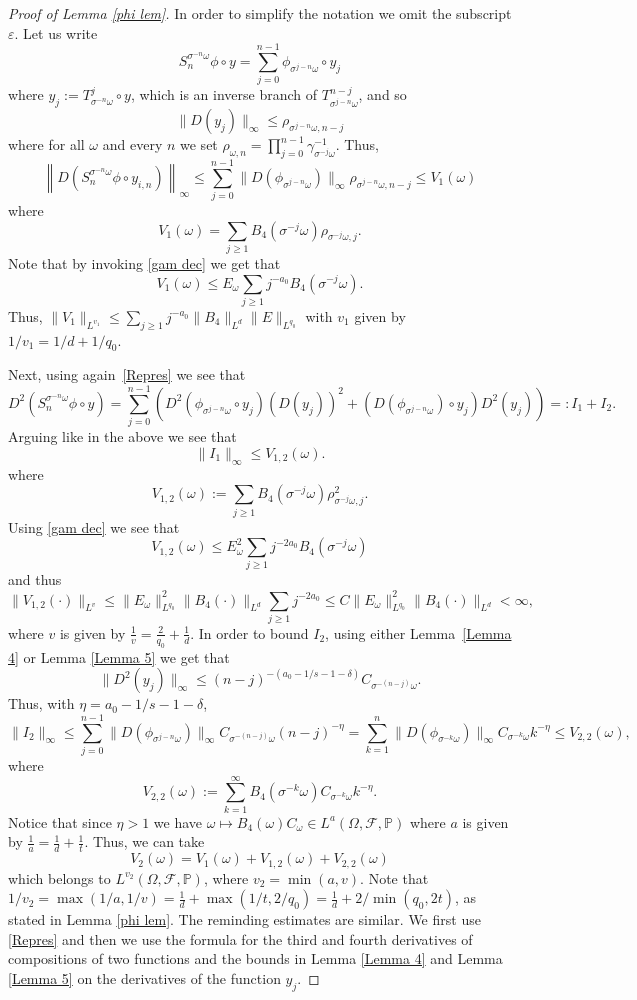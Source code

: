 \documentclass[11pt,reqno,a4paper]{article}
\theoremstyle{special}
\def\om{\omega}
\begin{document}
\begin{proof}[Proof of Lemma \ref{phi lem}]
In order to simplify the notation we omit the subscript $\varepsilon$. Let us write
\begin{equation}\label{Repres}
S_n^{\sigma^{-n}\omega}\phi \circ y=\sum_{j=0}^{n-1}\phi_{\sigma^{j-n}\omega}\circ y_j
\end{equation}
where
$y_{j}:=T_{\sigma^{-n}\omega}^j\circ y$, which is an inverse branch of $T_{\sigma^{j-n}\omega}^{n-j}$, and so 
$$
\|D(y_{j})\|_\infty\leq\rho_{\sigma^{j-n}\omega,n-j}
$$
where for all $\om$ and every $n$ we set $\rho_{\om,n}=\prod_{j=0}^{n-1}\gamma_{\sigma^{-j}\om}^{-1}$.
Thus, 
\begin{equation}\label{Sn phi 1}
\left\|D(S_n^{\sigma^{-n}\omega}\phi \circ y_{i,n})\right\|_\infty\leq \sum_{j=0}^{n-1}\|D(\phi_{\sigma^{j-n}\omega})\|_\infty\rho_{\sigma^{j-n}\omega,n-j}\leq V_1(\omega)  
\end{equation}
where
$$
V_1(\om)=\sum_{j\geq 1}B_4(\sigma^{-j}\om)\rho_{\sigma^{-j}\om,j}.
$$
Note that by invoking \eqref{gam dec} we get that 
$$
V_1(\om)\leq E_\om\sum_{j\geq 1}j^{-a_0}B_4(\sigma^{-j}\om).
$$
Thus, $\|V_1\|_{L^{v_1}}\leq \sum_{j\geq 1}j^{-a_0}\|B_4\|_{L^{d}}\|E\|_{L^{q_0}}$ with $v_1$ given by $1/v_1=1/d+1/q_0$.


Next, using again~\eqref{Repres}
we see that 
$$
D^2(S_n^{\sigma^{-n}\omega}\phi \circ y)=\sum_{j=0}^{n-1}\left(D^2(\phi_{\sigma^{j-n}\omega}\circ y_j)(D(y_{j}))^2+(D(\phi_{\sigma^{j-n}\omega})\circ y_{j})D^2(y_{j}) \right)=:I_1+I_2.
$$
Arguing like in the above we see that
$$
\|I_1 \|_\infty \leq  V_{1,2}(\omega).
$$
where 
$$
V_{1,2}(\om):=\sum_{j\geq 1}B_4(\sigma^{-j}\om)\rho_{\sigma^{-j}\om,j}^2.
$$
Using \eqref{gam dec} we see that $$
V_{1,2}(\om)\leq E_\om^2\sum_{j\geq 1}j^{-2a_0}B_4(\sigma^{-j}\om)
$$
and thus
$$
\|V_{1,2}(\cdot)\|_{L^{v}}\leq \|E_\om\|_{L^{q_0}}^2\|B_4(\cdot)\|_{L^d}\sum_{j\geq 1}j^{-2a_0}\leq C\|E_\om\|_{L^{q_0}}^2\|B_4(\cdot)\|_{L^d}<\infty,
$$
where $v$ is given by $\frac1{v}=\frac{2}{q_0}+\frac{1}d$.
In order to bound $I_2$, using either Lemma~\ref{Lemma 4} or Lemma \ref{Lemma 5} we get that
$$
\|D^2(y_{j})\|_\infty\leq (n-j)^{-(a_0-1/s-1-\delta)}C_{\sigma^{-(n-j)}\omega}. 
$$
Thus, with $\eta=a_0-1/s-1-\delta$, 
$$
\|I_2 \|_\infty \leq \sum_{j=0}^{n-1}\|D(\phi_{\sigma^{j-n}\omega})\|_\infty C_{\sigma^{-(n-j)}\omega}(n-j)^{-\eta}=\sum_{k=1}^n\|D(\phi_{\sigma^{-k}\omega})\|_\infty C_{\sigma^{-k}\omega}k^{-\eta}\leq V_{2,2}(\om),
$$
where 
$$
V_{2,2}(\om):=\sum_{k=1}^{\infty}B_4(\sigma^{-k}\om)C_{\sigma^{-k}\om}k^{-\eta}.
$$
Notice that  since $\eta>1$ we have $\om\mapsto B_4(\om)C_\om\in L^{a}(\Omega,\mathcal F,\mathbb P)$ where $a$ is given by $\frac1{a}=\frac{1}{d}+\frac{1}{t}$.
Thus, we can take
$$
V_2(\om)=V_1(\om)+V_{1,2}(\om)+V_{2,2}(\om)
$$
which belongs to $L^{v_2}(\Omega,\mathcal F,\mathbb P)$, where $v_2=\min(a,v)$. Note that $1/v_2=\max(1/a,1/v)=\frac1d+\max(1/t,2/q_0)=\frac1d+2/\min(q_0,2t)$, as stated in Lemma \ref{phi lem}.
The reminding  estimates are similar. We first use \eqref{Repres} and then we use the formula for the third and fourth derivatives of compositions of two functions and the bounds in Lemma \ref{Lemma 4} and Lemma \ref{Lemma 5} on the derivatives of the function $y_j$.


\end{proof}
\end{document}
